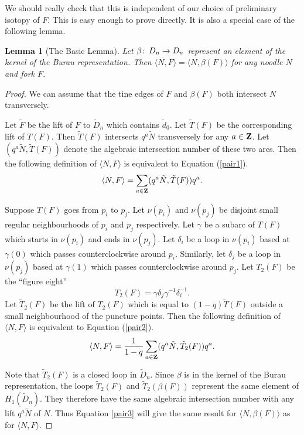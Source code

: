 \documentclass[10pt]{amsart}
\theoremstyle{plain}
\newtheorem{lem}[thm]{Lemma}
\theoremstyle{definition}
\newcommand{\Z}{{\bf{Z}}}
\newcommand{\co}{\colon\thinspace}
\begin{document}
We should really check that this is independent of 
our choice of preliminary isotopy of $F$.
This is easy enough to prove directly.
It is also a special case of the following lemma.

\begin{lem}[The Basic Lemma]
Let $\beta \co D_n \rightarrow D_n$
represent an element of the kernel of the Burau representation.
Then $\langle N,F \rangle = \langle N,\beta(F) \rangle$
for any noodle $N$ and fork $F$.
\end{lem}

\begin{proof}
We can assume that the tine edges of $F$ and $\beta(F)$
both intersect $N$ transversely.

Let $\tilde{F}$ be the lift of $F$ to $\tilde{D}_n$
which contains $\tilde{d}_0$.
Let $\tilde{T}(F)$ be the corresponding lift of $T(F)$.
Then $\tilde{T}(F)$ intersects $q^a \tilde{N}$
transversely for any $a \in \Z$.
Let $(q^a \tilde{N}, \tilde{T}(F))$
denote the algebraic intersection number of these two arcs.
Then the following definition of $\langle N,F \rangle$
is equivalent to Equation (\ref{pair1}).
\begin{equation}
\label{pair2}
\langle N,F \rangle = \sum_{a \in \Z} (q^a \tilde{N}, \tilde{T}(F))q^a.
\end{equation}

Suppose $T(F)$ goes from $p_i$ to $p_j$.
Let $\nu(p_i)$ and $\nu(p_j)$
be disjoint small regular neighbourhoods of $p_i$ and $p_j$ respectively.
Let $\gamma$ be a subarc of $T(F)$
which starts in $\nu(p_i)$ and ends in $\nu(p_j)$.
Let $\delta_i$ be a loop in $\nu(p_i)$ based at $\gamma(0)$
which passes counterclockwise around $p_i$.
Similarly, let $\delta_j$ be a loop in $\nu(p_j)$ based at $\gamma(1)$
which passes counterclockwise around $p_j$.
Let $T_2(F)$ be the ``figure eight''
$$T_2(F) = \gamma \delta_j \gamma^{-1} \delta_i^{-1}.$$
Let $\tilde{T}_2(F)$ be the lift of $T_2(F)$
which is equal to $(1-q)\tilde{T}(F)$ 
outside a small neighbourhood of the puncture points.
Then the following definition of $\langle N,F \rangle$
is equivalent to Equation (\ref{pair2}).
\begin{equation}
\label{pair3}
\langle N,F \rangle = \frac{1}{1-q}
\sum_{a \in \Z} (q^a \tilde{N}, \tilde{T}_2(F)) q^a.
\end{equation}

Note that $\tilde{T}_2(F)$ is a closed loop in $\tilde{D}_n$.
Since $\beta$ is in the kernel of the Burau representation,
the loops $\tilde{T}_2(F)$ and $\tilde{T}_2(\beta(F))$ 
represent the same element of $H_1(\tilde{D}_n)$.
They therefore have the same algebraic intersection number
with any lift $q^a \tilde{N}$ of $N$.
Thus Equation \ref{pair3} will give the same result
for $\langle N,\beta(F) \rangle$ as for $\langle N,F \rangle$.
\end{proof}
\end{document}
